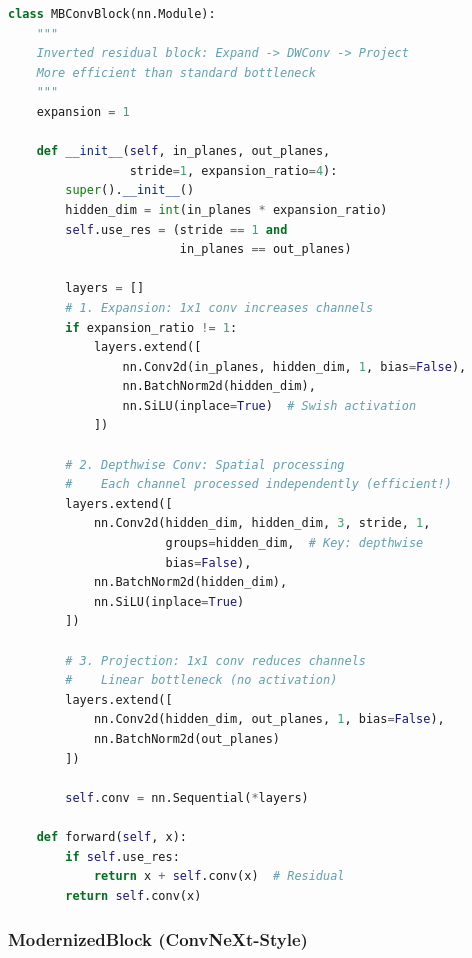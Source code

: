 \documentclass{article}
\begin{document}
\begin{lstlisting}[language=Python, caption=MobileNet-style Inverted Residual]
class MBConvBlock(nn.Module):
    """
    Inverted residual block: Expand -> DWConv -> Project
    More efficient than standard bottleneck
    """
    expansion = 1
    
    def __init__(self, in_planes, out_planes, 
                 stride=1, expansion_ratio=4):
        super().__init__()
        hidden_dim = int(in_planes * expansion_ratio)
        self.use_res = (stride == 1 and 
                        in_planes == out_planes)
        
        layers = []
        # 1. Expansion: 1x1 conv increases channels
        if expansion_ratio != 1:
            layers.extend([
                nn.Conv2d(in_planes, hidden_dim, 1, bias=False),
                nn.BatchNorm2d(hidden_dim),
                nn.SiLU(inplace=True)  # Swish activation
            ])
        
        # 2. Depthwise Conv: Spatial processing
        #    Each channel processed independently (efficient!)
        layers.extend([
            nn.Conv2d(hidden_dim, hidden_dim, 3, stride, 1,
                      groups=hidden_dim,  # Key: depthwise
                      bias=False),
            nn.BatchNorm2d(hidden_dim),
            nn.SiLU(inplace=True)
        ])
        
        # 3. Projection: 1x1 conv reduces channels
        #    Linear bottleneck (no activation)
        layers.extend([
            nn.Conv2d(hidden_dim, out_planes, 1, bias=False),
            nn.BatchNorm2d(out_planes)
        ])
        
        self.conv = nn.Sequential(*layers)
    
    def forward(self, x):
        if self.use_res:
            return x + self.conv(x)  # Residual
        return self.conv(x)
\end{lstlisting}

\subsubsection{ModernizedBlock (ConvNeXt-Style)}
\end{document}

